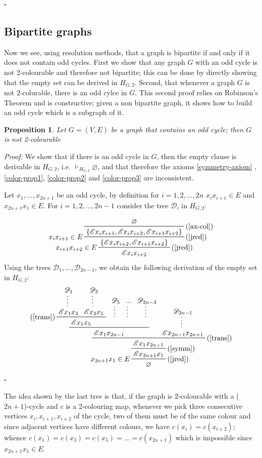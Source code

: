\documentclass[a4paper,12pt,oneside]{book}
\newtheorem{proposition}[theorem]{Proposition}
\newcommand{\E}{\mathscr{E}}
\newcommand{\D}{\mathscr{D}}
\newcommand*{\QED}{\hfill\ensuremath{\square}}
\let\emptyset\varnothing
\begin{document}
\QED


\subsection*{Bipartite graphs}
Now we see, using resolution methods, that a graph is bipartite  if and only if it does not contain odd cycles. First we show that any graph $G$ with an odd cycle is not 2-colourable and therefore not bipartite; this can be done by directly showing that the empty set can be derived in $H_{G,2}$. 
Second, that whenever a graph $G$ is not 2-colurable, there is an odd cylce in $G$. This second proof relies on Robinson's Theorem and is constructive; given a non bipartite graph, it shows how to build an odd cycle which is a subgraph of it. 

\begin{proposition}
Let $G=(V,E)$ be a graph that contains an odd cycle; then $G$ is not 2-colourable 
\end{proposition}
\textit{Proof:}
We show that if there is an odd cycle in $G$, then the empty clause is derivable in $H_ {G,2}$, i.e. $\vdash_{H_{G,2}} \emptyset$, and that therefore the axioms \ref{symmetry-axiom} ,\ref{color-prop1}, \ref{color-prop2} and \ref{color-prop3} are inconsistent.

Let $x_1, ..., x_{2n+1} $ be an odd cycle, by definition for $i=1,2,..., 2n$ $x_i x_{i+1} \in E$ and $ x_{2n+1} x_1 \in E$. For $i=1,2,...,2n-1$ consider the tree $\D_i$ in $H_{G,2}$:

$$
\prftree[r,l]{(\ref{jred})}{$x_{i+1} x_{i+2} \in E$}{
\prftree[r,l]{(\ref{jred})}{$x_i x_{i+1} \in E$} 
{ \prftree[r]{(\ref{ax-col})}{\emptyset}
{\{\E x_i x_{i+1} , \E x_{i} x_{i+2} , \E x_{i+1} x_{i+2}\}}}
{\{ \E x_{i} x_{i+2} , \E x_{i+1} x_{i+2}  \}}
}
{\E x_i x_{i+2}}
$$
\newpage Using the trees $\D_1,...,\D_{2n-1}$, we obtain the following derivation of the empty set in $H_{G,2}$:
$$
\prftree[r,l]{(\ref{jred})}{$x_{2n+1}x_1\in E$}
{ \prftree[r]{(\ref{symm})}
{\prftree[r]{(\ref{trans})} 
{\prftree{ \prftree[l]{(\ref{trans})}{ \prfsummary{\D_1} {\E x_1x_3}  }{  \prfsummary{\D_3}{\E x_3x_5} }
{\E x_1 x_5}}{\prfsummary{ \D_5}{ }}{ \prfsummary{...}{} }{\prfsummary{ \D_{2n-3}}{ }}
{ \E x_1 x_{2n-1}}}{\prfsummary{\D_{2n-1}} { \E x_{2n-1}x_{2n+1}}}
{\E x_1 x_{2n+1} } }  
{\E x_{2n+1}x_1} }
{\emptyset}
$$
\QED

The idea shown by the last tree is that, if the graph is 2-colourable with a ($2n+1$)-cycle and $c$ is a 2-colouring map, whenever we pick three consecutive vertices $x_i,x_{i+1},x_{i+2}$ of the cycle, two of them must be of the same colour and since adjacent vertices have different colours, we have $c(x_i)=c(x_{i+2})$; whence $c(x_1)=c(x_3)=c(x_5)=...=c(x_{2n+1})$ which is impossible since $x_{2n+1}x_1 \in E$.
\end{document}
